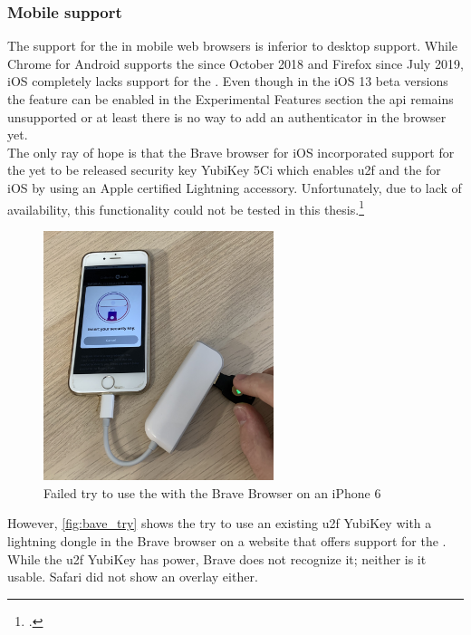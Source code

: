\subsubsection{Mobile support}

The support for the \wa{} in mobile web browsers is inferior to desktop support. While Chrome for Android supports the \wa{} since October 2018 and Firefox since July 2019, iOS completely lacks support for the \wa. Even though in the iOS 13 beta versions the feature can be enabled in the \frqq Experimental Features\flqq{} section the \gls{api} remains unsupported or at least there is no way to add an authenticator in the browser yet.\\
The only ray of hope is that the Brave browser for iOS incorporated support for the yet to be released security key \frqq YubiKey 5Ci\flqq{} which enables \gls{u2f} and the \wa{} for iOS by using an Apple certified Lightning accessory. Unfortunately, due to lack of availability, this functionality could not be tested in this thesis.\footcites[See][]{brave-ios}[See][]{brave-now-available}
\\

\begin{figure}[hbt]
	\centering
	\includegraphics[width=0.6\textwidth]{pics/brave_try_dongle.eps}
	\caption[Failed try to use the \wa{} with the Brave Browser on an iPhone 6]{Failed try to use the \wa{} with the Brave Browser on an iPhone 6\footnotemark}
	\label{fig:bave_try}
\end{figure}

However, \autoref{fig:bave_try} shows the try to use an existing \gls{u2f} YubiKey with a lightning dongle in the Brave browser on a website that offers support for the \wa. While the \gls{u2f} YubiKey has power, Brave does not recognize it; neither is it usable. Safari did not show an overlay either.

